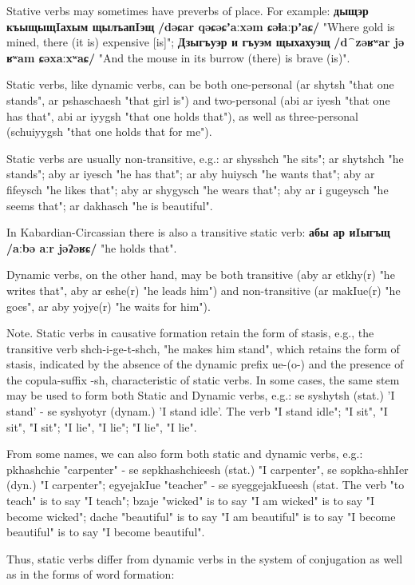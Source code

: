\documentclass[a4paper,12pt]{book}
\newcommand{\1}[1]{\textbf{\emph{#1}}} %
\newcommand{\2}[1]{\textbf{[#1]}} %
\newcommand{\3}[1]{\fontsize{11pt}{0cm}\textbf{\emph{#1}}} %
\newcommand{\4}[1]{\fontsize{10pt}{0cm}\emph{#1}}	%
\newcommand{\5}[1]{\textbf{/#1/}} %
\newcommand{\6}[1]{\textbf{[#1]}} %
\newcommand{\7}[1]{\fontsize{12pt}{0cm}\emph{#1}} %
\newcommand{\8}[1]{\fontsize{12pt}{0cm}`#1'} %
\newcommand{\9}[1]{\fontsize{12pt}{0cm}(lit. `#1')} %
\newcommand{\glossphonemics}[1]{\textbf{/#1/}} %
\begin{document}
Stative verbs may sometimes have preverbs of place. For example: \textbf{дыщэр къыщыщIахым щылъапIэщ} \glossphonemics{dəɕar qəɕəɕʼaːxəm ɕəɬaːpʼaɕ} "Where gold is mined, there (it is) expensive [is]"; \textbf{Дзыгъуэр и гъуэм щыхахуэщ} \glossphonemics{d⁀zəʁʷar jə ʁʷam ɕəxaːxʷaɕ} "And the mouse in its burrow (there) is brave (is)".

Static verbs, like dynamic verbs, can be both one-personal (ar shytsh "that one stands", ar pshaschaesh "that girl is") and two-personal (abi ar iyesh "that one has that", abi ar iyygsh "that one holds that"), as well as three-personal (schuiyygsh "that one holds that for me").

Static verbs are usually non-transitive, e.g.: ar shysshch "he sits"; ar shytshch "he stands"; aby ar iyesch "he has that"; ar aby huiysch "he wants that"; aby ar fifeysch "he likes that"; aby ar shygysch "he wears that"; aby ar i gugeysch "he seems that"; ar dakhasch "he is beautiful".

In Kabardian-Circassian there is also a transitive static verb: \textbf{абы ар иIыгъщ} \glossphonemics{aːbə aːr jəʔəʁɕ} "he holds that".

Dynamic verbs, on the other hand, may be both transitive (aby ar etkhy(r) "he writes that", aby ar eshe(r) "he leads him") and non-transitive (ar makIue(r) "he goes", ar aby yojye(r) "he waits for him").

Note. Static verbs in causative formation retain the form of stasis, e.g., the transitive verb shch-i-ge-t-shch, "he makes him stand", which retains the form of stasis, indicated by the absence of the dynamic prefix ue-(o-) and the presence of the copula-suffix -sh, characteristic of static verbs.
In some cases, the same stem may be used to form both Static and Dynamic verbs, e.g.: se syshytsh (stat.) 'I stand' - se syshyotyr (dynam.) 'I stand idle'. The verb "I stand idle"; "I sit", "I sit", "I sit"; "I lie", "I lie"; "I lie", "I lie".

From some names, we can also form both static and dynamic verbs, e.g.: pkhashchie "carpenter" - se sepkhashchieesh (stat.) "I carpenter", se sopkha-shhIer (dyn.) "I carpenter"; egyejakIue "teacher" - se syeggejakIueesh (stat. The verb "to teach" is to say "I teach"; bzaje "wicked" is to say "I am wicked" is to say "I become wicked"; dache "beautiful" is to say "I am beautiful" is to say "I become beautiful" is to say "I become beautiful".

Thus, static verbs differ from dynamic verbs in the system of conjugation as well as in the forms of word formation:
\end{document}
